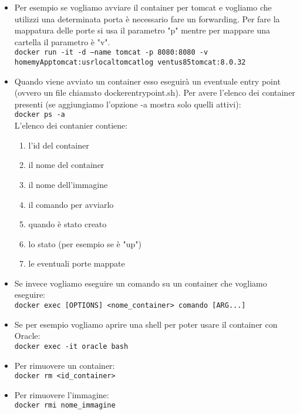 \begin{itemize}
\item Per esempio se vogliamo avviare il container per tomcat e vogliamo che utilizzi una determinata porta è necessario fare un forwarding. Per fare la mappatura delle porte si usa il parametro "p" mentre per mappare una cartella il parametro è "v".\\
\texttt{docker run -it -d --name tomcat -p 8080:8080 -v \/home\/myApp\/tomcat:\/usr\/local\/tomcat\/log ventus85\/tomcat:8.0.32}\\

\item Quando viene avviato un container esso eseguirà un eventuale entry point (ovvero un file chiamato docker\-entrypoint.sh).
Per avere l'elenco dei container presenti (se aggiungiamo l'opzione -a mostra solo quelli attivi):\\
\texttt{docker ps -a}\\
L'elenco dei contanier contiene:\\
\begin{enumerate}\item l'id del container
\item il nome del container
\item il nome dell'immagine
\item il comando per avviarlo
\item quando è stato creato
\item lo stato (per esempio se è "up")
\item le eventuali porte mappate
\end{enumerate}

\item Se invece vogliamo eseguire un comando su un container che vogliamo eseguire:\\
\texttt{docker exec [OPTIONS] <nome\_container> comando [ARG...]}\\

\item Se per esempio vogliamo aprire una shell per poter usare il container con Oracle:\\
\texttt{docker exec -it oracle bash}\\

\item Per rimuovere un container:\\
\texttt{docker rm <id\_container>}\\

\item Per rimuovere l'immagine:\\
\texttt{docker rmi nome\_immagine}\\


\end{itemize}
